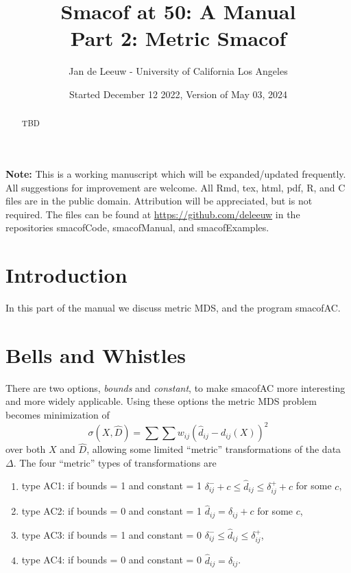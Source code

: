 \documentclass[
  12pt,
]{article}
\title{Smacof at 50: A Manual\\
Part 2: Metric Smacof}
\author{Jan de Leeuw - University of California Los Angeles}
\date{Started December 12 2022, Version of May 03, 2024}
\providecommand{\tightlist}{%
  \setlength{\itemsep}{0pt}\setlength{\parskip}{0pt}}
\begin{document}
\maketitle
\begin{abstract}
TBD
\end{abstract}

{
\setcounter{tocdepth}{3}
\tableofcontents
}
\textbf{Note:} This is a working manuscript which will be expanded/updated
frequently. All suggestions for improvement are welcome. All Rmd, tex,
html, pdf, R, and C files are in the public domain. Attribution will be
appreciated, but is not required. The files can be found at
\url{https://github.com/deleeuw} in the repositories smacofCode, smacofManual,
and smacofExamples.

\section{Introduction}\label{introduction}

In this part of the manual we discuss metric MDS, and the program
smacofAC.

\section{Bells and Whistles}\label{bells-and-whistles}

There are two options, \emph{bounds} and \emph{constant}, to make smacofAC more interesting and more widely applicable. Using these options the metric MDS problem becomes minimization of
\[
\sigma(X,\hat D)=\sum\sum w_{ij}(\hat d_{ij}-d_{ij}(X))^2
\]
over both \(X\) and \(\hat D\), allowing some limited ``metric'' transformations of the data \(\Delta\).
The four ``metric'' types of transformations are

\begin{enumerate}
\def\labelenumi{\arabic{enumi}.}
\tightlist
\item
  type AC1: if bounds = 1 and constant = 1 \(\delta^-_{ij}+c\leq\hat d_{ij}\leq\delta^+_{ij}+c\) for some \(c\),
\item
  type AC2: if bounds = 0 and constant = 1 \(\hat d_{ij}=\delta_{ij}+c\) for some \(c\),
\item
  type AC3: if bounds = 1 and constant = 0 \(\delta^-_{ij}\leq\hat d_{ij}\leq\delta^+_{ij}\),
\item
  type AC4: if bounds = 0 and constant = 0 \(\hat d_{ij}=\delta_{ij}\).
\end{enumerate}
\end{document}
